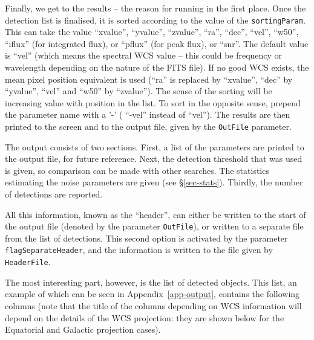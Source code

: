 
\label{sec-results}

Finally, we get to the results -- the reason for running \duchamp in
the first place. Once the detection list is finalised, it is sorted
according to the value of the \texttt{sortingParam}. This can take the
value ``xvalue'', ``yvalue'', ``zvalue'', ``ra'', ``dec'', ``vel'',
``w50'', ``iflux'' (for integrated flux), or ``pflux'' (for peak
flux), or ``snr''. The default value is ``vel'' (which means the
spectral WCS value -- this could be frequency or wavelength depending
on the nature of the FITS file). If no good WCS exists, the mean pixel
position equivalent is used (``ra'' is replaced by ``xvalue'', ``dec''
by ``yvalue'', ``vel'' and ``w50'' by ``zvalue''). The sense of the
sorting will be increasing value with position in the list. To sort in
the opposite sense, prepend the parameter name with a '-' (\eg
``-vel'' instead of ``vel''). The results are then printed to the
screen and to the output file, given by the \texttt{OutFile}
parameter.

The output consists of two sections. First, a list of the parameters
are printed to the output file, for future reference. Next, the
detection threshold that was used is given, so comparison can be made
with other searches. The statistics estimating the noise parameters
are given (see \S\ref{sec-stats}). Thirdly, the number of detections
are reported.

All this information, known as the ``header'', can either be written
to the start of the output file (denoted by the parameter
\texttt{OutFile}), or written to a separate file from the list of
detections. This second option is activated by the parameter
\texttt{flagSeparateHeader}, and the information is written to the
file given by \texttt{HeaderFile}.

The most interesting part, however, is the list of detected
objects. This list, an example of which can be seen in
Appendix~\ref{app-output}, contains the following columns (note that
the title of the columns depending on WCS information will depend on
the details of the WCS projection: they are shown below for the
Equatorial and Galactic projection cases).

